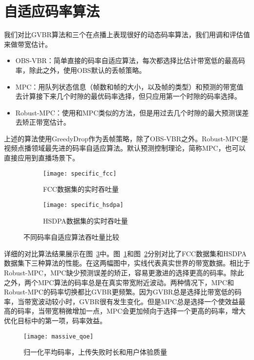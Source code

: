 \section{自适应码率算法}
我们对比GVBR算法和三个在点播上表现很好的动态码率算法，我们用调和评估值来做带宽估计。
\begin{itemize}
  \item OBS-VBR：简单直接的码率自适应算法，每次都选择比估计带宽低的最高码率，除此之外，使用OBS默认的丢帧策略。
  \item MPC：用队列状态信息（帧数和帧的大小，以及帧的类型）和预测的带宽值去计算接下来几个时隙的最优码率选择，但只应用第一个时隙的码率选择。
  \item Robust-MPC：使用和MPC类似的方法，但是用过去几个时隙的最大预测误差去矫正带宽估计。
\end{itemize}
上述的算法使用GreedyDrop作为丢帧策略，除了OBS-VBR之外。Robust-MPC是视频点播领域最先进的码率自适应算法。默认预测控制理论，简称MPC，也可以直接应用到直播场景下。

\begin{figure}[htb]
  \centering%
  \begin{subfigure}{0.7\textwidth}
    \texttt{[image: specific\_fcc]}
    \caption{FCC数据集的实时吞吐量}
    \label{fig:fcc}
  \end{subfigure}%
  \vfill
  \vspace{0.2in}
  \begin{subfigure}{0.7\textwidth}
    \texttt{[image: specific\_hsdpa]}
    \caption{HSDPA数据集的实时吞吐量}
    \label{fig:hsdpa}
  \end{subfigure}
  \caption{不同码率自适应算法吞吐量比较}
  \label{fig:specific}
\end{figure}

详细的对比算法结果展示在图~\ref{fig:specific}中。图~\ref{fig:fcc}和图~\ref{fig:hsdpa}分别对比了FCC数据集和HSDPA数据集下三种算法的性能。在这两幅图中，实线代表真实世界的带宽数据。相比于Robust-MPC，MPC缺少预测误差的矫正，容易更激进的选择更高的码率。除此之外，两个MPC算法的码率总是在真实带宽附近波动。两种情况下，MPC和Robust-MPC的码率切换都比GVBR更频繁。因为GVBR总是选择比带宽低的码率，当带宽波动较小时，GVBR很有发生变化。但是MPC总是选择一个使效益最高的码率，当带宽稍微增加一点，MPC会更加倾向于选择一个更高的码率，增大优化目标中的第一项，码率效益。

\begin{figure}[htb]%
  \centering
  \texttt{[image: massive\_qoe]}
  \caption{归一化平均码率，上传失败时长和用户体验质量}
  \label{fig:massive_qoe}
\end{figure}

